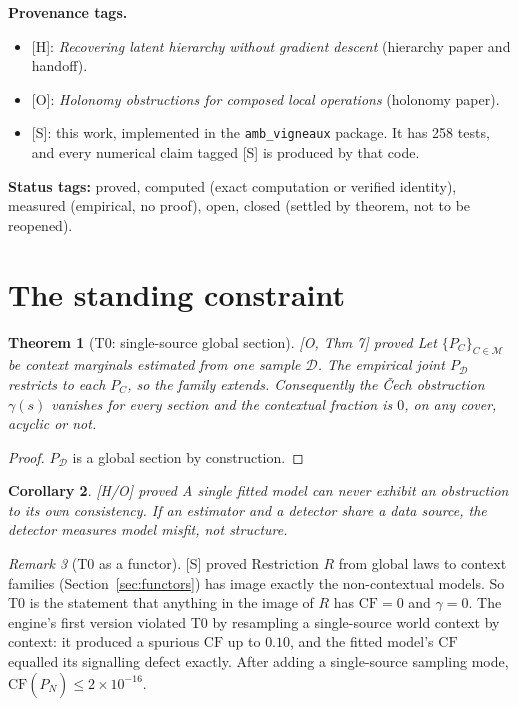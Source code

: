 \documentclass[11pt]{article}
\newtheorem{theorem}{Theorem}[section]
\newtheorem{corollary}[theorem]{Corollary}
\theoremstyle{definition}
\theoremstyle{remark}
\newtheorem{remark}[theorem]{Remark}
\newcommand{\CF}{\mathrm{CF}}
\newcommand{\src}[1]{\textsf{\small[#1]}}
\newcommand{\st}[1]{\textsf{\small\color{gray}#1}}
\begin{document}
\noindent\textbf{Provenance tags.}
\begin{itemize}
  \item \src{H}: \emph{Recovering latent hierarchy without gradient descent} (hierarchy paper and handoff).
  \item \src{O}: \emph{Holonomy obstructions for composed local operations} (holonomy paper).
  \item \src{S}: this work, implemented in the \texttt{amb\_vigneaux} package. It has 258 tests, and every numerical claim tagged \src{S} is produced by that code.
\end{itemize}
\noindent\textbf{Status tags:} \st{proved}, \st{computed} (exact computation or verified identity), \st{measured} (empirical, no proof), \st{open}, \st{closed} (settled by theorem, not to be reopened).

\tableofcontents
\newpage

\section{The standing constraint}

\begin{theorem}[T0: single-source global section]\label{thm:T0}
\src{O, Thm 7} \st{proved}
Let $\{P_C\}_{C\in\mathcal M}$ be context marginals estimated from one sample $\mathcal D$. The empirical joint $P_{\mathcal D}$ restricts to each $P_C$, so the family extends. Consequently the \v{C}ech obstruction $\gamma(s)$ vanishes for every section and the contextual fraction is $0$, on any cover, acyclic or not.
\end{theorem}
\begin{proof}
$P_{\mathcal D}$ is a global section by construction.
\end{proof}

\begin{corollary}\label{cor:T0}
\src{H/O} \st{proved}
A single fitted model can never exhibit an obstruction to its own consistency. If an estimator and a detector share a data source, the detector measures model misfit, not structure.
\end{corollary}

\begin{remark}[T0 as a functor]
\src{S} \st{proved}
Restriction $R$ from global laws to context families (Section~\ref{sec:functors}) has image exactly the non-contextual models. So T0 is the statement that anything in the image of $R$ has $\CF=0$ and $\gamma=0$. The engine's first version violated T0 by resampling a single-source world context by context: it produced a spurious $\CF$ up to $0.10$, and the fitted model's $\CF$ equalled its signalling defect exactly. After adding a single-source sampling mode, $\CF(\hat P_N)\le2\times10^{-16}$.
\end{remark}
\end{document}
